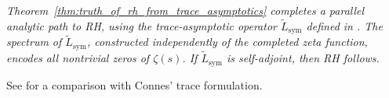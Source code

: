 


\medskip
\noindent
\emph{Theorem~\ref{thm:truth_of_rh_from_trace_asymptotics} completes a parallel analytic path to RH, using the trace-asymptotic operator \( \tilde{L}_{\mathrm{sym}} \) defined in . The spectrum of \( \tilde{L}_{\mathrm{sym}} \), constructed independently of the completed zeta function, encodes all nontrivial zeros of \( \zeta(s) \). If \( \tilde{L}_{\mathrm{sym}} \) is self-adjoint, then RH follows.}





See  for a comparison with Connes’ trace formulation.


